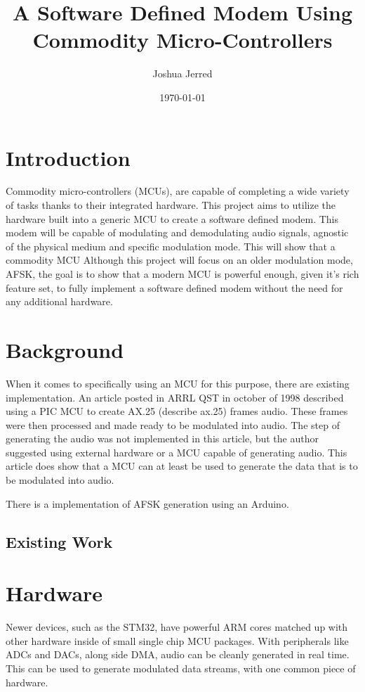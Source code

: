 \documentclass{journal}
\title{A Software Defined Modem Using Commodity Micro-Controllers}
\author{Joshua Jerred}
\date{\today}
\begin{document}
\maketitle

\section{Introduction}

Commodity micro-controllers (MCUs), are capable of completing a wide variety of tasks thanks to their integrated hardware. This project aims to utilize the hardware built into a generic MCU to create a software defined modem. This modem will be capable of modulating and demodulating audio signals, agnostic of the physical medium and specific modulation mode. This will show that a commodity MCU  Although this project will focus on an older modulation mode, AFSK, the goal is to show that a modern MCU is powerful enough, given it's rich feature set, to fully implement a software defined modem without the need for any additional hardware.

\section{Background}

When it comes to specifically using an MCU for this purpose, there are existing implementation. An article posted in ARRL QST in october of 1998 described using a PIC MCU to create AX.25 (describe ax.25) frames audio\cite{hansen_ax25}. These frames were then processed and made ready to be modulated into audio. The step of generating the audio was not implemented in this article, but the author suggested using external hardware or a MCU capable of generating audio. This article does show that a MCU can at least be used to generate the data that is to be modulated into audio.

There is a implementation of AFSK generation using an Arduino\cite{arduino_afsk}.




\subsection{Existing Work} %


\section{Hardware}
Newer devices, such as the STM32, have powerful ARM cores matched up with other hardware inside of small single chip MCU packages. With peripherals like ADCs and DACs, along side DMA, audio can be cleanly generated in real time. This can be used to generate modulated data streams, with one common piece of hardware.
\end{document}

